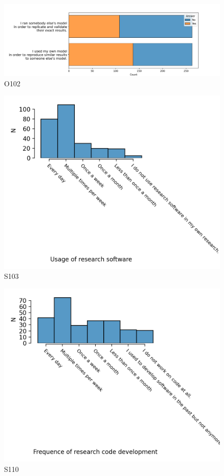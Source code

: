 \documentclass{article}
\begin{document}
\begin{figure}[!p]
    \centering
    \includegraphics[width=\textwidth]{../figs/O102.png}
	\caption{O102 }
    \label{fig:O102}
\end{figure}

\begin{figure}[!p]
    \centering
    \includegraphics[width=\textwidth]{../figs/S103.png}
	\caption{S103 }
    \label{fig:S103}
\end{figure}

\begin{figure}[!p]
    \centering
    \includegraphics[width=\textwidth]{../figs/S110.png}
	\caption{S110 }
    \label{fig:S110}
\end{figure}
\end{document}
